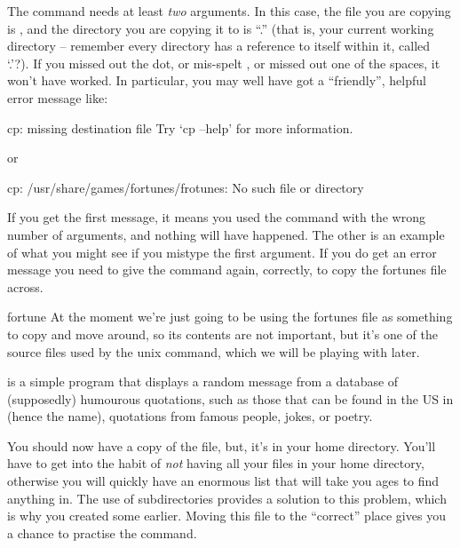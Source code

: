 The  command needs at least \emph{two} arguments. In this case, the file
you are copying is , and the directory
you are copying it to is ``.'' (that is, your current working
directory -- remember every directory has a reference to itself within
it, called `.'?). If you missed out the dot, or mis-spelt
, or missed out one of the spaces, it
won't have worked. In particular, you may well have got a
``friendly'', helpful error message like:
%
\begin{ttoutenv}
  cp: missing destination file
  Try `cp --help' for more information.
\end{ttoutenv}
%
or
\begin{ttoutenv}
  cp: /usr/share/games/fortunes/frotunes: No such file or directory
\end{ttoutenv}
%
If you get the first message, it means you used the command with the
wrong number of arguments, and nothing will have happened.
The other is an example of what you might see if you mistype the first
argument. If you do get an error message you need to give the command again,
correctly, to copy the fortunes file across.

\begin{linux}{fortune}
  \label{breakbox:fortune}
  At the moment we're just going to be using the fortunes file as something to copy and move around, so its contents are not important, but it's one of the source files used by the unix  command, which we will be playing with later.

   is a simple program that displays a random message from a database of (supposedly) humourous quotations, such as those that can be found in the US in  (hence the name), quotations from famous people, jokes, or poetry.

\end{linux}

You should now have a copy of the file, but, it's in your home directory.
You'll have to get into the habit of \emph{not} having all your files
in your home directory, otherwise you will quickly have an enormous list
that will take you ages to find anything in. The use of subdirectories
provides a solution to this problem, which is why you created some
earlier. Moving this file to the ``correct'' place gives you a chance
to practise the  command.

